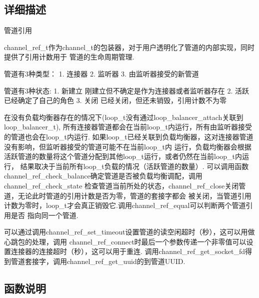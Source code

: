 \subsection{详细描述}
管道引用


\begin{DoxyPre}
channel\_ref\_t作为channel\_t的包装器，对于用户透明化了管道的内部实现，同时提供了引用计数用于
管道的生命周期管理.\end{DoxyPre}



\begin{DoxyPre}管道有3种类型：
1. 连接器
2. 监听器
3. 由监听器接受的新管道\end{DoxyPre}



\begin{DoxyPre}管道有3种状态:
1. 新建立 刚建立但不确定是作为连接器或者监听器存在
2. 活跃   已经确定了自己的角色
3. 关闭   已经关闭，但还未销毁，引用计数不为零\end{DoxyPre}



\begin{DoxyPre}在没有负载均衡器存在的情况下(loop\_t没有通过loop\_balancer\_attach关联到loop\_balancer\_t),
所有连接器管道都会在当前loop\_t内运行，所有由监听器接受的管道也会在loop\_t内运行.
如果loop\_t已经关联到负载均衡器，这对连接器管道没有影响，但监听器接受的管道可能不在当前loop\_t内
运行，负载均衡器会根据活跃管道的数量将这个管道分配到其他loop\_t运行，或者仍然在当前loop\_t内运行，
结果取决于当前所有loop\_t负载的情况（活跃管道的数量）.
可以调用函数channel\_ref\_check\_balance确定管道是否被负载均衡调配，调用channel\_ref\_check\_state
检查管道当前所处的状态，channel\_ref\_close关闭管道，无论此时管道的引用计数是否为零，管道的套接字都会
被关闭，当管道引用计数为零时，loop\_t才会真正销毁它.调用channel\_ref\_equal可以判断两个管道引用是否
指向同一个管道.\end{DoxyPre}



\begin{DoxyPre}可以通过调用channel\_ref\_set\_timeout设置管道的读空闲超时（秒），这可以用做心跳包的处理，调用
channel\_ref\_connect时最后一个参数传递一个非零值可以设置连接器的连接超时（秒），这可以用于重连.
调用channel\_ref\_get\_socket\_fd得到管道套接字，调用channel\_ref\_get\_uuid的到管道UUID.
\end{DoxyPre}
 

\subsection{函数说明}
\hypertarget{group___xE7_xAE_xA1_xE9_x81_x93_xE5_xBC_x95_xE7_x94_xA8_gae9ae0ae2a42eabf6a544ce4e0f001c9e}{}
